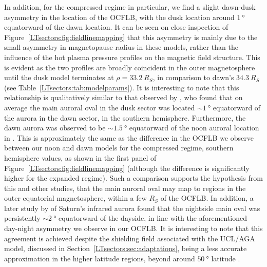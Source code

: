 In addition, for the compressed regime in particular, we find a slight dawn-dusk asymmetry in the location of the OCFLB, with the dusk location around $\SI{1}{\degree}$ equatorward of the dawn location. It can be seen on close inspection of Figure~\ref{LTsectors:fig:fieldlinemapping} that this asymmetry is mainly due to the small asymmetry in magnetopause radius in these models, rather than the influence of the hot plasma pressure profiles on the magnetic field structure. This is evident as the two profiles are broadly coincident in the outer magnetosphere until the dusk model terminates at $\rho=\SI{33.2}{R_S}$, in comparison to dawn's $\SI{34.3}{R_S}$ (see Table~\ref{LTsectors:tab:modelparams}). It is interesting to note that this relationship is qualitatively similar to that observed by \citet{badman2006}, who found that on average the main auroral oval in the dusk sector was located ${\sim}\SI{1}{\degree}$ equatorward of the aurora in the dawn sector, in the southern hemisphere. Furthermore, the dawn aurora was observed to be ${\sim}\SI{1.5}{\degree}$ equatorward of the noon auroral location in \citet{badman2006}. This is approximately the same as the difference in the OCFLB we observe between our noon and dawn models for the compressed regime, southern hemisphere values, as shown in the first panel of Figure~\ref{LTsectors:fig:fieldlinemapping} (although the difference is significantly higher for the expanded regime). Such a comparison supports the hypothesis from this and other studies, that the main auroral oval may map to regions in the outer equatorial magnetosphere, within a few $\si{R_S}$ of the OCFLB. In addition, a later study by \citet{badman2011} of Saturn's infrared aurora found that the nightside main oval was persistently ${\sim}\SI{2}{\degree}$ equatorward of the dayside, in line with the aforementioned day-night asymmetry we observe in our OCFLB. It is interesting to note that this agreement is achieved despite the shielding field associated with the UCL/AGA model, discussed in Section~\ref{LTsectors:sec:adaptations}, being a less accurate approximation in the higher latitude regions, beyond around $\SI{50}{\degree}$ latitude \citep{caudal1986}.


